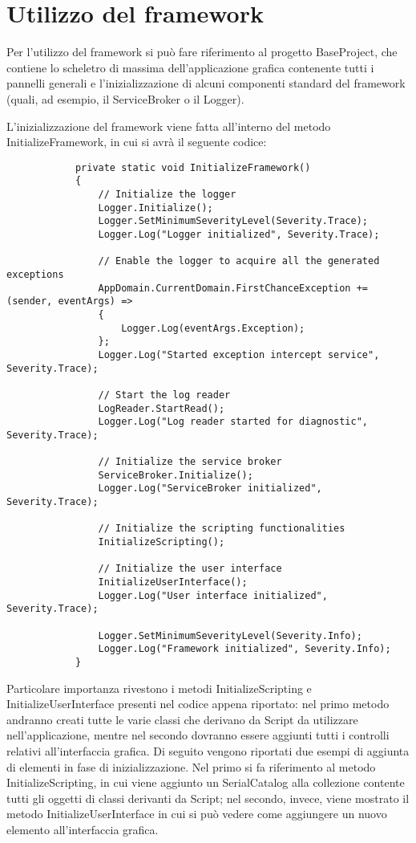 \documentclass{article}
\begin{document}
	\section{Utilizzo del framework}
		Per l'utilizzo del framework si può fare riferimento al progetto BaseProject, che contiene lo scheletro di massima dell'applicazione grafica contenente tutti i pannelli generali e l'inizializzazione di alcuni componenti standard del framework (quali, ad esempio, il ServiceBroker o il Logger).
		\par
		L'inizializzazione del framework viene fatta all'interno del metodo InitializeFramework, in cui si avrà il seguente codice:
		
		\begin{lstlisting}
			private static void InitializeFramework()
			{
				// Initialize the logger
				Logger.Initialize();
				Logger.SetMinimumSeverityLevel(Severity.Trace);
				Logger.Log("Logger initialized", Severity.Trace);
				
				// Enable the logger to acquire all the generated exceptions
				AppDomain.CurrentDomain.FirstChanceException += (sender, eventArgs) =>
				{
					Logger.Log(eventArgs.Exception);
				};
				Logger.Log("Started exception intercept service", Severity.Trace);
				
				// Start the log reader
				LogReader.StartRead();
				Logger.Log("Log reader started for diagnostic", Severity.Trace);
				
				// Initialize the service broker
				ServiceBroker.Initialize();
				Logger.Log("ServiceBroker initialized", Severity.Trace);
				
				// Initialize the scripting functionalities
				InitializeScripting();
				
				// Initialize the user interface
				InitializeUserInterface();
				Logger.Log("User interface initialized", Severity.Trace);
				
				Logger.SetMinimumSeverityLevel(Severity.Info);
				Logger.Log("Framework initialized", Severity.Info);
			}
		\end{lstlisting}
	
		Particolare importanza rivestono i metodi InitializeScripting e InitializeUserInterface presenti nel codice appena riportato: nel primo metodo andranno creati tutte le varie classi che derivano da Script da utilizzare nell'applicazione, mentre nel secondo dovranno essere aggiunti tutti i controlli relativi all'interfaccia grafica.
		\newline
		Di seguito vengono riportati due esempi di aggiunta di elementi in fase di inizializzazione. Nel primo si fa riferimento al metodo InitializeScripting, in cui viene aggiunto un SerialCatalog alla collezione contente tutti gli oggetti di classi derivanti da Script; nel secondo, invece, viene mostrato il metodo InitializeUserInterface in cui si può vedere come aggiungere un nuovo elemento  all'interfaccia grafica.
		
\end{document}
